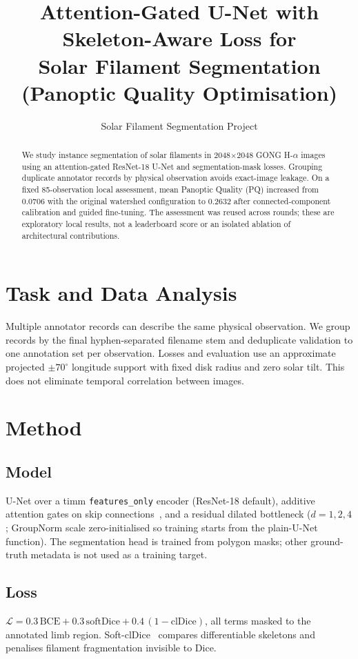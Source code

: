 \documentclass[10pt]{article}
\title{Attention-Gated U-Net with Skeleton-Aware Loss for\\
Solar Filament Segmentation (Panoptic Quality Optimisation)}
\author{Solar Filament Segmentation Project}
\date{}
\begin{document}
\maketitle

\begin{abstract}
We study instance segmentation of solar filaments in 2048$\times$2048 GONG
H-$\alpha$ images using an attention-gated ResNet-18 U-Net and segmentation-mask
losses. Grouping duplicate annotator records by physical observation avoids
exact-image leakage. On a fixed 85-observation local assessment, mean Panoptic
Quality (PQ) increased from 0.0706 with the original watershed configuration
to 0.2632 after connected-component calibration and guided fine-tuning.
The assessment was reused across rounds; these are exploratory local results,
not a leaderboard score or an isolated ablation of architectural contributions.
\end{abstract}

\section{Task and Data Analysis}
Multiple annotator records can describe the same physical observation.
We group records by the final hyphen-separated filename stem and deduplicate
validation to one annotation set per observation. Losses and evaluation use an
approximate projected $\pm70^{\circ}$ longitude support with fixed disk radius
and zero solar tilt. This does not eliminate temporal correlation between images.

\section{Method}
\subsection{Model}
U-Net over a timm \texttt{features\_only} encoder (ResNet-18 default), additive
attention gates on skip connections~\cite{oktay2018}, and a residual dilated
bottleneck ($d\!=\!1,2,4$; GroupNorm scale zero-initialised so training starts
from the plain-U-Net function). The segmentation head is trained from polygon masks;
other ground-truth metadata is not used as a training target.

\subsection{Loss}
$\mathcal{L} = 0.3\,\mathrm{BCE} + 0.3\,\mathrm{softDice} + 0.4\,(1-\mathrm{clDice})$,
all terms masked to the annotated limb region. Soft-clDice~\cite{shit2021} compares differentiable skeletons and
penalises filament fragmentation invisible to Dice.
\end{document}
